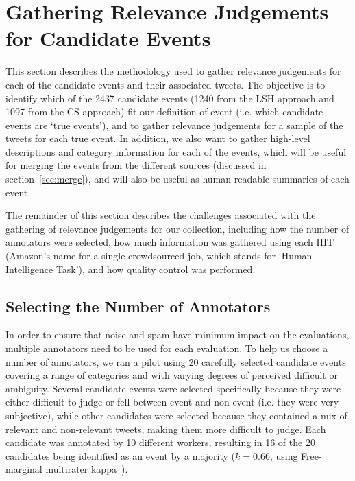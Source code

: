 \section{Gathering Relevance Judgements for Candidate Events}
This section describes the methodology used to gather relevance judgements for each of the candidate events and their associated tweets.
The objective is to identify which of the 2437 candidate events (1240 from the LSH approach and 1097 from the CS approach) fit our definition of event (i.e. which candidate events are `true events'), and to gather relevance judgements for a sample of the tweets for each true event.
In addition, we also want to gather high-level descriptions and category information for each of the events, which will be useful for merging the events from the different sources (discussed in section~\ref{sec:merge}), and will also be useful as human readable summaries of each event.

The remainder of this section describes the challenges associated with the gathering of relevance judgements for our collection, including how the number of annotators were selected, how much information was gathered using each HIT (Amazon's name for a single crowdsourced job, which stands for `Human Intelligence Task'), and how quality control was performed.

\subsection{Selecting the Number of Annotators}
\label{sec:numAnnotators}
In order to ensure that noise and spam have minimum impact on the evaluations, multiple annotators need to be used for each evaluation.
To help us choose a number of annotators, we ran a pilot using 20 carefully selected candidate events covering a range of categories and with varying degrees of perceived difficult or ambiguity.
Several candidate events were selected specifically because they were either difficult to judge or fell between event and non-event (i.e. they were very subjective), while other candidates were selected because they contained a mix of relevant and non-relevant tweets, making them more difficult to judge.
Each candidate was annotated by 10 different workers, resulting in 16 of the 20 candidates being identified as an event by a majority (\(k = 0.66\), using Free-marginal multirater kappa~\citep{Randolph}).


